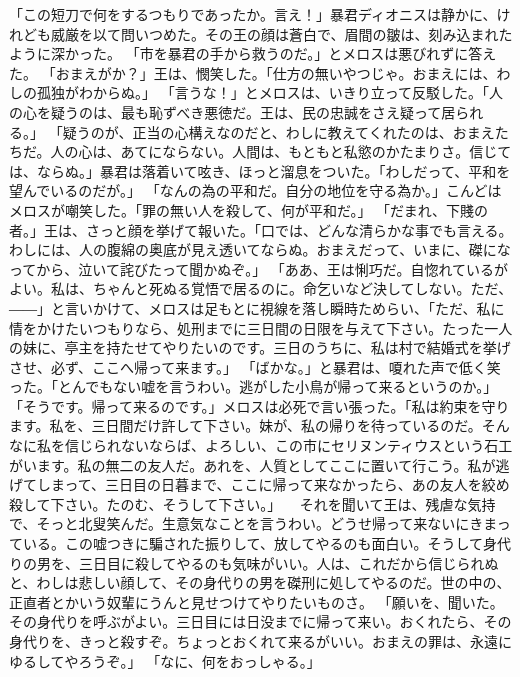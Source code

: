 \documentclass[uplatex, twocolumn,10pt]{jsarticle}
\begin{document}
\begin{thebibliography}{99}
「この短刀で何をするつもりであったか。言え！」暴君ディオニスは静かに、けれども威厳を以て問いつめた。その王の顔は蒼白で、眉間の皺は、刻み込まれたように深かった。
「市を暴君の手から救うのだ。」とメロスは悪びれずに答えた。
「おまえがか？」王は、憫笑した。「仕方の無いやつじゃ。おまえには、わしの孤独がわからぬ。」
「言うな！」とメロスは、いきり立って反駁した。「人の心を疑うのは、最も恥ずべき悪徳だ。王は、民の忠誠をさえ疑って居られる。」
「疑うのが、正当の心構えなのだと、わしに教えてくれたのは、おまえたちだ。人の心は、あてにならない。人間は、もともと私慾のかたまりさ。信じては、ならぬ。」暴君は落着いて呟き、ほっと溜息をついた。「わしだって、平和を望んでいるのだが。」
「なんの為の平和だ。自分の地位を守る為か。」こんどはメロスが嘲笑した。「罪の無い人を殺して、何が平和だ。」
「だまれ、下賤の者。」王は、さっと顔を挙げて報いた。「口では、どんな清らかな事でも言える。わしには、人の腹綿の奥底が見え透いてならぬ。おまえだって、いまに、磔になってから、泣いて詫びたって聞かぬぞ。」
「ああ、王は悧巧だ。自惚れているがよい。私は、ちゃんと死ぬる覚悟で居るのに。命乞いなど決してしない。ただ、――」と言いかけて、メロスは足もとに視線を落し瞬時ためらい、「ただ、私に情をかけたいつもりなら、処刑までに三日間の日限を与えて下さい。たった一人の妹に、亭主を持たせてやりたいのです。三日のうちに、私は村で結婚式を挙げさせ、必ず、ここへ帰って来ます。」
「ばかな。」と暴君は、嗄れた声で低く笑った。「とんでもない嘘を言うわい。逃がした小鳥が帰って来るというのか。」
「そうです。帰って来るのです。」メロスは必死で言い張った。「私は約束を守ります。私を、三日間だけ許して下さい。妹が、私の帰りを待っているのだ。そんなに私を信じられないならば、よろしい、この市にセリヌンティウスという石工がいます。私の無二の友人だ。あれを、人質としてここに置いて行こう。私が逃げてしまって、三日目の日暮まで、ここに帰って来なかったら、あの友人を絞め殺して下さい。たのむ、そうして下さい。」
　それを聞いて王は、残虐な気持で、そっと北叟笑んだ。生意気なことを言うわい。どうせ帰って来ないにきまっている。この嘘つきに騙された振りして、放してやるのも面白い。そうして身代りの男を、三日目に殺してやるのも気味がいい。人は、これだから信じられぬと、わしは悲しい顔して、その身代りの男を磔刑に処してやるのだ。世の中の、正直者とかいう奴輩にうんと見せつけてやりたいものさ。
「願いを、聞いた。その身代りを呼ぶがよい。三日目には日没までに帰って来い。おくれたら、その身代りを、きっと殺すぞ。ちょっとおくれて来るがいい。おまえの罪は、永遠にゆるしてやろうぞ。」
「なに、何をおっしゃる。」
\end{thebibliography}

\layout
\end{document}
